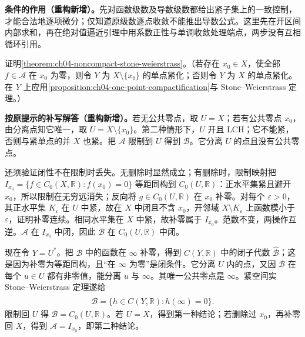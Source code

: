 \documentclass[../../main.tex]{subfiles}%
\begin{document}
\begin{remark}
\textbf{条件的作用（重构新增）。}先对函数级数及导数级数都给出紧子集上的一致控制，才能合法地逐项微分；仅知道原级数逐点收敛不能推出导数公式。这里先在开区间内部求和，再在绝对值逼近引理中用系数正性与单调收敛处理端点，两步没有互相循环引用。
\end{remark}
\begin{exercise}\label{exercise:ch04-prove-noncompact-sw}
证明\cref{theorem:ch04-noncompact-stone-weierstrass}。（若存在 $x_0\in X$，使全部 $f\in\mathcal A$ 在 $x_0$ 为零，则令 $Y$ 为 $X\setminus\{x_0\}$ 的单点紧化；否则令 $Y$ 为 $X$ 的单点紧化。在 $Y$ 上应用\cref{proposition:ch04-one-point-compactification}与 Stone--Weierstrass 定理。）
\end{exercise}
\begin{solution}
\textbf{按原提示的补写解答（重构新增）。}若无公共零点，取 $U=X$；若有公共零点 $x_0$，由分离点知它唯一，取 $U=X\setminus\{x_0\}$。第二种情形下，$U$ 开且 LCH；它不能紧，否则与紧单点的并 $X$ 也紧。把 $\mathcal A$ 限制到 $U$ 得到 $\mathcal B$。它分离 $U$ 的点且没有公共零点。

还须验证闭性不在限制时丢失。无删除时显然成立；有删除时，限制映射把 $I_{x_0}=\{f\in C_0(X,\mathbb R):f(x_0)=0\}$ 等距同构到 $C_0(U,\mathbb R)$：正水平集紧且避开 $x_0$，所以限制在无穷远消失；反向将 $g\in C_0(U,\mathbb R)$ 在 $x_0$ 补零。对每个 $\varepsilon>0$，其正水平集 $K_\varepsilon$ 在 $U$ 中紧，故在 $X$ 中闭且不含 $x_0$，开邻域 $X\setminus K_\varepsilon$ 上函数模小于 $\varepsilon$，证明补零连续。相同水平集在 $X$ 中紧，故补零属于 $I_{x_0}$。范数不变，两操作互逆。$\mathcal A$ 在 $I_{x_0}$ 中闭，因此 $\mathcal B$ 在 $C_0(U,\mathbb R)$ 中闭。

现在令 $Y=U^*$。把 $\mathcal B$ 中的函数在 $\infty$ 补零，得到 $C(Y,\mathbb R)$ 中的闭子代数 $\widehat{\mathcal B}$；这是因为补零为等距同构，且“在 $\infty$ 为零”是闭条件。它分离 $U$ 内的点，又因 $\mathcal B$ 在每个 $u\in U$ 都有非零值，能分离 $u$ 与 $\infty$。其唯一公共零点是 $\infty$。紧空间实 Stone--Weierstrass 定理遂给
\begin{align*}
\widehat{\mathcal B}=\{h\in C(Y,\mathbb R):h(\infty)=0\}.
\end{align*}
限制回 $U$ 得 $\mathcal B=C_0(U,\mathbb R)$。若 $U=X$，得到第一种结论；若删除过 $x_0$，再补零回 $X$，得到 $\mathcal A=I_{x_0}$，即第二种结论。
\end{solution}
\end{document}
